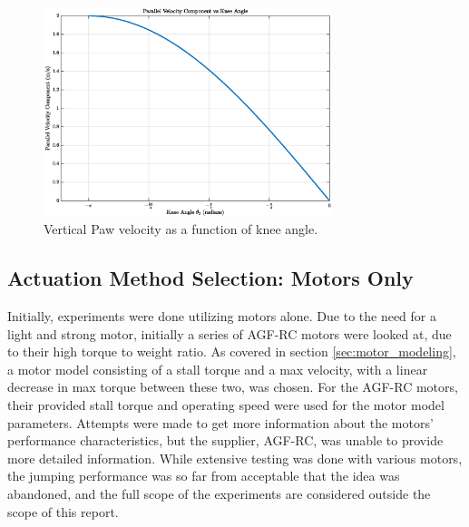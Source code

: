 \begin{figure}[h]
    \centering
    \includegraphics[width=0.75\textwidth]{Images/vertical_jacobian_velocity.eps}
    \caption{Vertical Paw velocity as a function of knee angle.}
    \label{fig:vertical_jacobian_velocity}
\end{figure}

\subsection{Actuation Method Selection: Motors Only}
\label{sec:design_motor_only_jumps}

Initially, experiments were done utilizing motors alone. Due to the need for a light and strong motor, initially a series of AGF-RC motors were looked at, due to their high torque to weight ratio. As covered in section \ref{sec:motor_modeling}, a motor model consisting of a stall torque and a max velocity, with a linear decrease in max torque between these two, was chosen. For the AGF-RC motors, their provided stall torque and operating speed were used for the motor model parameters. Attempts were made to get more information about the motors' performance characteristics, but the supplier, AGF-RC, was unable to provide more detailed information. While extensive testing was done with various motors, the jumping performance was so far from acceptable that the idea was abandoned, and the full scope of the experiments are considered outside the scope of this report.

